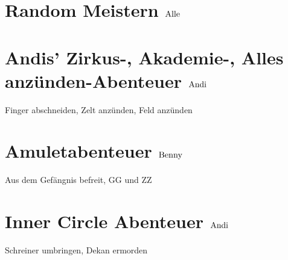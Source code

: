 \section{Random Meistern \hfill $\rm{Alle}$}
\section{Andis' Zirkus-, Akademie-, Alles anz\"unden-Abenteuer \hfill $\rm{Andi}$}
Finger abschneiden, Zelt anzünden, Feld anzünden
\section{Amuletabenteuer \hfill $\rm{Benny}$}
Aus dem Gef\"angnis befreit, GG und ZZ
\section{Inner Circle Abenteuer \hfill $\rm{Andi}$}
Schreiner umbringen, Dekan ermorden